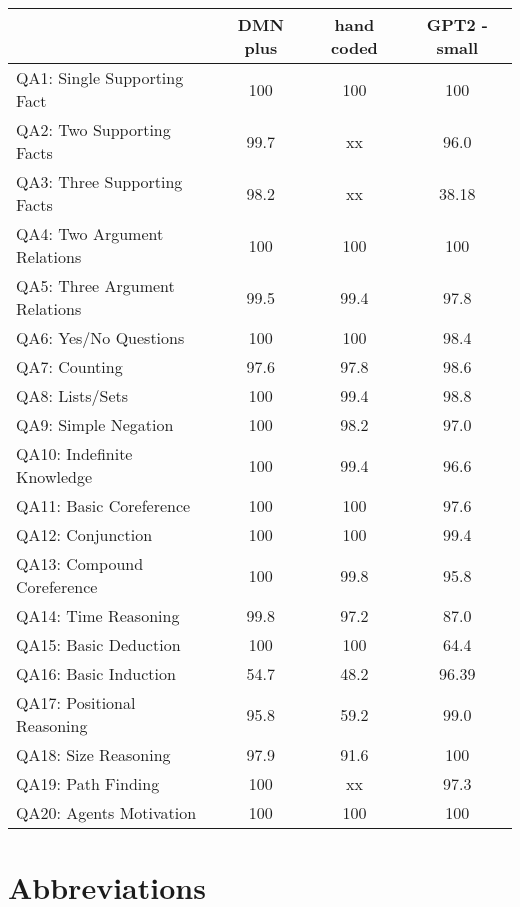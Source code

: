 \documentclass[english]{report}
\providecommand{\tabularnewline}{\\}
\begin{document}
\begin{center}


\begin{tabular}{|l|c|c|c|}
	\hline 
	& {\small{}DMN plus} & {\small{}hand coded}  & {\small{}GPT2 - small}  \tabularnewline
	\hline 
	\hline 
	{\small{}QA1: Single Supporting Fact} & {\small{}100} & {\small{}100} & {\small{}100}  \tabularnewline
	\hline 
	{\small{}QA2: Two Supporting Facts} & {\small{}99.7} & {\small{}xx}  & {\small{}96.0} \tabularnewline
	\hline 
	{\small{}QA3: Three Supporting Facts} & {\small{}98.2} & {\small{}xx} & {\small{}38.18}  \tabularnewline
	\hline 
	{\small{}QA4: Two Argument Relations} & {\small{}100} & {\small{}100}  & {\small{}100} \tabularnewline
	\hline 
	{\small{}QA5: Three Argument Relations} & {\small{}99.5} & {\small{}99.4}  & {\small{}97.8} \tabularnewline
	\hline 
	{\small{}QA6: Yes/No Questions} & {\small{}100} & {\small{}100}  & {\small{}98.4} \tabularnewline
	\hline 
	{\small{}QA7: Counting} & {\small{}97.6} & {\small{}97.8} & {\small{}98.6} \tabularnewline
	\hline 
	{\small{}QA8: Lists/Sets} & {\small{}100} & {\small{}99.4} & {\small{}98.8} \tabularnewline
	\hline 
	{\small{}QA9: Simple Negation} & {\small{}100} & {\small{}98.2}  & {\small{}97.0}  \tabularnewline
	\hline 
	{\small{}QA10: Indefinite Knowledge} & {\small{}100} & {\small{}99.4} & {\small{}96.6} \tabularnewline
	\hline 
	{\small{}QA11: Basic Coreference} & {\small{}100} & {\small{}100} & {\small{}97.6} \tabularnewline
	\hline 
	{\small{}QA12: Conjunction} & {\small{}100} & {\small{}100} & {\small{}99.4} \tabularnewline
	\hline 
	{\small{}QA13: Compound Coreference} & {\small{}100} & {\small{}99.8} & {\small{}95.8} \tabularnewline
	\hline 
	{\small{}QA14: Time Reasoning} & {\small{}99.8} & {\small{}97.2} & {\small{}87.0} \tabularnewline
	\hline 
	{\small{}QA15: Basic Deduction} & {\small{}100} & {\small{}100} & {\small{}64.4} \tabularnewline
	\hline 
	{\small{}QA16: Basic Induction} & {\small{}54.7} & {\small{}48.2} & {\small{}96.39} \tabularnewline
	\hline 
	{\small{}QA17: Positional Reasoning} & {\small{}95.8} & {\small{}59.2} & {\small{}99.0} \tabularnewline
	\hline 
	{\small{}QA18: Size Reasoning} & {\small{}97.9} & {\small{}91.6} & {\small{}100} \tabularnewline
	\hline 
	{\small{}QA19: Path Finding} & {\small{}100} & {\small{}xx} & {\small{}97.3} \tabularnewline
	\hline 
	{\small{}QA20: Agents Motivation} & {\small{}100} & {\small{}100} & {\small{}100} \tabularnewline
	\hline 
\end{tabular}{\tiny \par}
\label{fig:babiresults}
	
\end{center}
\fi

\newpage

\chapter{Abbreviations}

\printacronyms[include-classes=abbrev,name=]

\newpage


%




\end{document}
